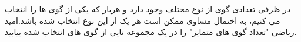 
در ظرفی تعدادی گوی از  نوع مختلف وجود دارد و هربار که یکی از گوی ها را انتخاب می کنیم، به اختمال مساوی ممکن است هر یک از این  نوع انتخاب شده باشد.امید ریاضی "تعداد گوی های متمایز" را در یک مجموعه  تایی از گوی های انتخاب شده بیابید.

